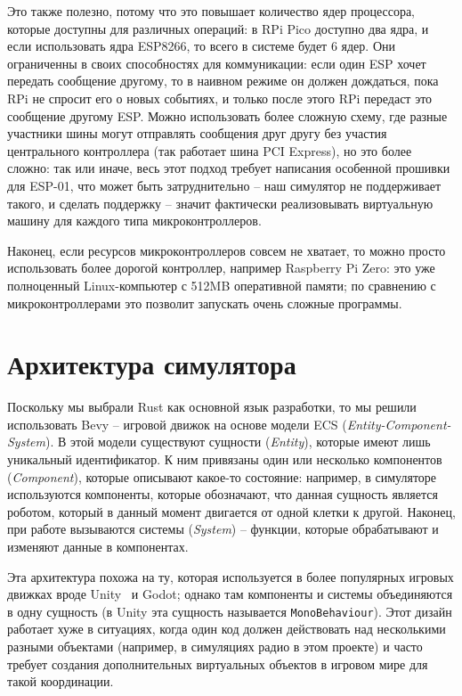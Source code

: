 \documentclass[%
]{report}
\begin{document}
Это также полезно, потому что это повышает количество ядер процессора,
которые доступны для различных операций:
в RPi Pico доступно два ядра,
и если использовать ядра ESP8266,
то всего в системе будет 6 ядер.
Они ограниченны в своих способностях для коммуникации:
если один ESP хочет передать сообщение другому,
то в наивном режиме он должен дождаться,
пока RPi не спросит его о новых событиях,
и только после этого RPi передаст это сообщение другому ESP.
Можно использовать более сложную схему, 
где разные участники шины могут отправлять сообщения друг другу
без участия центрального контроллера
(так работает шина PCI Express),
но это более сложно:
так или иначе, весь этот подход требует написания особенной прошивки
для ESP-01,
что может быть затруднительно --
наш симулятор не поддерживает такого,
и сделать поддержку -- значит фактически реализовывать виртуальную машину
для каждого типа микроконтроллеров.

Наконец, если ресурсов микроконтроллеров совсем не хватает,
то можно просто  использовать более дорогой контроллер,
например Raspberry Pi Zero:
это уже полноценный Linux-компьютер с 512MB оперативной памяти;
по сравнению с микроконтроллерами это позволит запускать
очень сложные программы.

\section{Архитектура симулятора}

Поскольку мы выбрали Rust как основной язык разработки,
то мы решили использовать Bevy -- игровой движок на основе модели ECS
(\emph{Entity-Component-System}).
В этой модели существуют сущности (\emph{Entity}),
которые имеют лишь уникальный идентификатор.
К ним привязаны один или несколько компонентов
(\emph{Component}), которые описывают какое-то состояние:
например, в симуляторе используются компоненты,
которые обозначают, что данная сущность является роботом,
который в данный момент двигается от одной клетки к другой.
Наконец, при работе вызываются системы (\emph{System}) --
функции, которые обрабатывают и изменяют данные
в компонентах.

Эта архитектура похожа на ту, которая используется в более популярных
игровых движках вроде Unity~\cite{unity} и Godot;
однако там компоненты и системы
объединяются в одну сущность
(в Unity эта сущность называется \texttt{MonoBehaviour}).
Этот дизайн работает хуже в ситуациях,
когда один код должен действовать над несколькими разными объектами
(например, в симуляциях радио в этом проекте)
и часто требует создания дополнительных виртуальных объектов в игровом мире
для такой координации.
\end{document}
